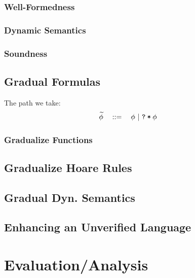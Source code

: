     \subsection{Well-Formedness}
    \label{sec:well-formedness}
    
    
    \subsection{Dynamic Semantics}
    \label{ssec:dynamic-semantics}
    
    
    \subsection{Soundness}

\section{Gradual Formulas}
The path we take:
\begin{align*}
&\widetilde{\phi} \quad ::= \quad \phi ~|~ \texttt{\texttt{?}\:*\:\ensuremath{\phi}}
\end{align*}

\subsection{Gradualize Functions}

\section{Gradualize Hoare Rules}

\section{Gradual Dyn. Semantics}


\section{Enhancing an Unverified Language}





\chapter{Evaluation/Analysis}
\label{ch:evaluation-analysis}



